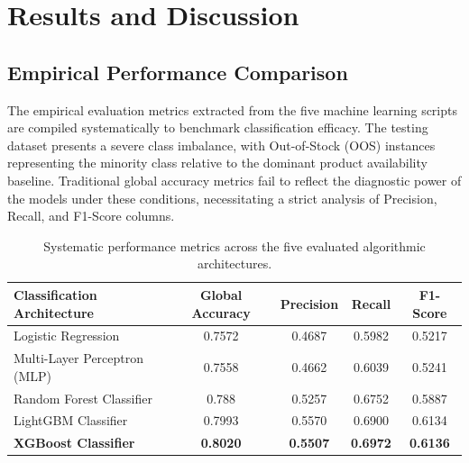 \documentclass[11pt, a4paper]{article}
\begin{document}
\section{Results and Discussion}

\subsection{Empirical Performance Comparison}
The empirical evaluation metrics extracted from the five machine learning scripts are compiled systematically to benchmark classification efficacy. The testing dataset presents a severe class imbalance, with Out-of-Stock (OOS) instances representing the minority class relative to the dominant product availability baseline. Traditional global accuracy metrics fail to reflect the diagnostic power of the models under these conditions, necessitating a strict analysis of Precision, Recall, and F1-Score columns.

\begin{table}[H]
    \centering
    \caption{Systematic performance metrics across the five evaluated algorithmic architectures.}
    \label{tab:model_performance_detailed}
    \begin{tabular}{|l|c|c|c|c|}
        \hline
        \textbf{Classification Architecture} & \textbf{Global Accuracy} & \textbf{Precision} & \textbf{Recall} & \textbf{F1-Score} \\
        \hline
        Logistic Regression                 & 0.7572                    & 0.4687             & 0.5982          & 0.5217            \\
        Multi-Layer Perceptron (MLP)        & 0.7558                    & 0.4662             & 0.6039          & 0.5241            \\
        Random Forest Classifier            & 0.788                    & 0.5257             & 0.6752         & 0.5887            \\
        LightGBM Classifier                 &  0.7993                   & 0.5570             & 0.6900          & 0.6134            \\
        \textbf{XGBoost Classifier}         & \textbf{0.8020}           & \textbf{0.5507}    & \textbf{0.6972} & \textbf{0.6136}   \\
        \hline
    \end{tabular}
\end{table}
\end{document}
